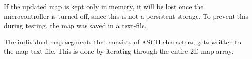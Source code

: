 If the updated map is kept only in memory, it will be lost once the microcontroller is turned off, since this is not a persistent storage. To prevent this during testing, the map was saved in a text-file.

The individual map segments that consists of ASCII characters, gets written to the map text-file.
This is done by iterating through the entire 2D map array.


